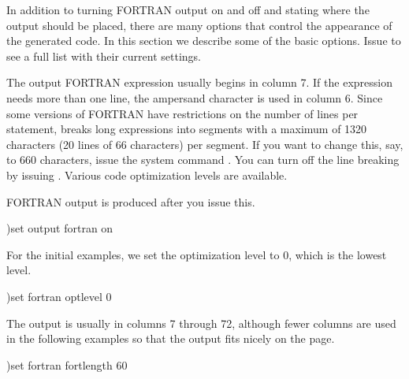 
In addition to turning FORTRAN output on and off and stating where the
output should be placed, there are many options that control the
appearance of the generated code.
In this section we describe some of the basic options.
Issue  to see a full list with their current
settings.

The output FORTRAN expression usually begins in column 7.
If the expression needs more than one line, the ampersand character
\spadSyntax{&} is used in column 6.
Since some versions of FORTRAN have restrictions on the number of lines
per statement, \Language{} breaks long expressions into segments with
a maximum of 1320 characters (20 lines of 66 characters) per segment.
If you want to change this, say, to 660 characters,
issue the system command
.
You can turn off the line breaking by issuing
.
Various code optimization levels are available.
%
\begin{noOutputXtc}
\begin{xtccomment}
FORTRAN output is produced after you issue this.
\end{xtccomment}
\begin{spadsrc}
)set output fortran on 
\end{spadsrc}
\end{noOutputXtc}
\begin{noOutputXtc}
\begin{xtccomment}
For the initial examples, we set the optimization level to 0, which is the
lowest level.
\end{xtccomment}
\begin{spadsrc}
)set fortran optlevel 0 
\end{spadsrc}
\end{noOutputXtc}
\begin{noOutputXtc}
\begin{xtccomment}
The output is usually in columns 7 through 72, although fewer columns
are used in the following examples so that the output
fits nicely on the page.
\end{xtccomment}
\begin{spadsrc}
)set fortran fortlength 60
\end{spadsrc}
\end{noOutputXtc}
